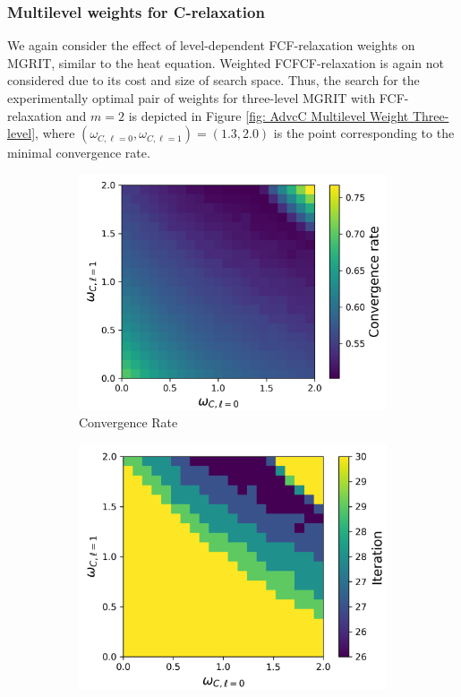 \documentclass[VANCOUVER,STIX1COL]{WileyNJD-v2}
\begin{document}
\subsubsection{Multilevel weights for C-relaxation}
\label{sec:ml_w_LA}
We again consider the effect of level-dependent FCF-relaxation weights on MGRIT, similar to the heat equation.  
Weighted FCFCF-relaxation is again not considered due to its cost and size of search space. Thus, the search
for the experimentally optimal pair of weights for three-level MGRIT with FCF-relaxation and $m=2$ is depicted
in Figure \ref{fig: AdvcC Multilevel Weight Three-level}, where $(\omega_{C,\ell=0}, \omega_{C,\ell=1})=(1.3, 2.0)$
is the point corresponding to the minimal convergence rate.

\begin{figure}[h!]
    \centering
    \begin{subfigure}[b]{0.4\textwidth}
    \includegraphics[width=\textwidth]{images/Advc1D_1025_MultiLevel_Conv.png}
    \caption{\normalsize Convergence Rate}
    \end{subfigure}
     \begin{subfigure}[b]{0.38\textwidth}
    \includegraphics[width=\textwidth]{images/Advc1D_1025_MultiLevel_Iter.png}

\end{subfigure}
\end{figure}
\end{document}
